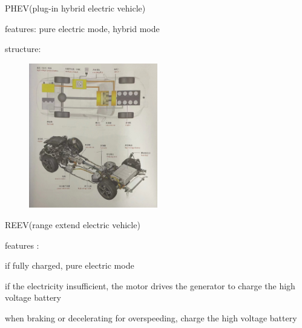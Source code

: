\begin{frame}
	\begin{block}{PHEV(plug-in hybrid electric vehicle)}
		\begin{compactitem}
			\item features: pure electric mode, hybrid mode
			\item structure:
				\begin{figure}[htbp]
					\centering
					\includegraphics[width=0.5\textwidth]{1-18}
				\end{figure}
		\end{compactitem}		
	\end{block}
\end{frame}
\begin{frame}
	\begin{block}{REEV(range extend electric vehicle)}
		\begin{compactitem}
			\item features :
			\begin{compactenum}
				\item if fully charged, pure electric mode
				\item if the electricity insufficient, the motor drives the generator to charge the high voltage battery
				\item when braking or decelerating for overspeeding, charge the high voltage battery
			\end{compactenum}
		\end{compactitem}
	\end{block}
\end{frame}
